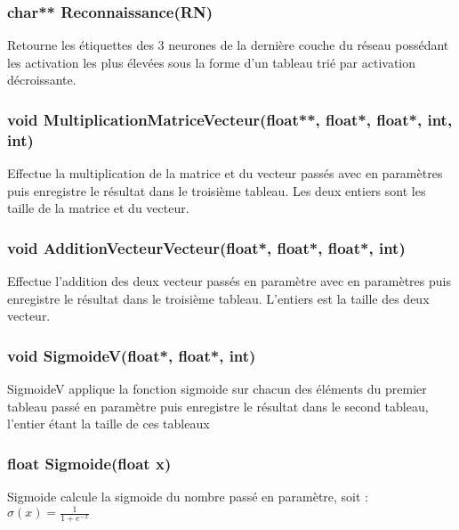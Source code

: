 \documentclass{article}
\begin{document}
		\subsubsection{\textcolor{myblue}{\textbf{char**}} Reconnaissance(\textcolor{myblue}{\textbf{RN}})}
		Retourne les étiquettes des 3 neurones de la dernière couche du réseau possédant les activation les plus élevées sous la forme d'un tableau trié par activation décroissante.
		
		\subsubsection{\textcolor{myblue}{\textbf{void}} MultiplicationMatriceVecteur(\textcolor{myblue}{\textbf{float**}},  \textcolor{myblue}{\textbf{float*}},  \textcolor{myblue}{\textbf{float*}},  \textcolor{myblue}{\textbf{int}},  \textcolor{myblue}{\textbf{int}})}
		Effectue la multiplication de la matrice et du vecteur passés avec en paramètres puis enregistre le résultat dans le troisième tableau. Les deux entiers sont les taille de la matrice et du vecteur.
		
		\subsubsection{\textcolor{myblue}{\textbf{void}} AdditionVecteurVecteur(\textcolor{myblue}{\textbf{float*}},  \textcolor{myblue}{\textbf{float*}},  \textcolor{myblue}{\textbf{float*}},  \textcolor{myblue}{\textbf{int}})}
		Effectue l'addition des deux vecteur passés en paramètre avec en paramètres  puis enregistre le résultat dans le troisième tableau. L'entiers est la taille des deux vecteur.
		
		\subsubsection{\textcolor{myblue}{\textbf{void}} SigmoideV(\textcolor{myblue}{\textbf{float*}},  \textcolor{myblue}{\textbf{float*}},  \textcolor{myblue}{\textbf{int}})}
		SigmoideV applique la fonction sigmoide sur chacun des éléments du premier tableau passé en paramètre puis enregistre le résultat dans le second tableau, l'entier étant la taille de ces tableaux
		
		\subsubsection{\textcolor{myblue}{\textbf{float}} Sigmoide(\textcolor{myblue}{\textbf{float}} x)}
		Sigmoide calcule la sigmoide du nombre passé en paramètre, soit : \\
		$\sigma(x) = \frac{1}{1+e^{-x}}$
		
\end{document}
